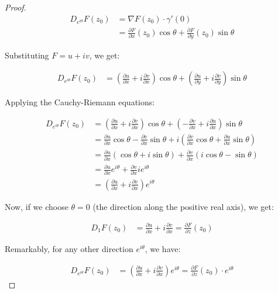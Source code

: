 \begin{proof}
\begin{align}
D_{e^{i\theta}}F(z_0) &= \nabla F(z_0) \cdot \gamma'(0) \\
&= \frac{\partial F}{\partial x}(z_0) \cos\theta + \frac{\partial F}{\partial y}(z_0) \sin\theta
\end{align}

Substituting $F = u + iv$, we get:

\begin{align}
D_{e^{i\theta}}F(z_0) &= \left(\frac{\partial u}{\partial x} + i\frac{\partial v}{\partial x}\right) \cos\theta + \left(\frac{\partial u}{\partial y} + i\frac{\partial v}{\partial y}\right) \sin\theta
\end{align}

Applying the Cauchy-Riemann equations:

\begin{align}
D_{e^{i\theta}}F(z_0) &= \left(\frac{\partial u}{\partial x} + i\frac{\partial v}{\partial x}\right) \cos\theta + \left(-\frac{\partial v}{\partial x} + i\frac{\partial u}{\partial x}\right) \sin\theta \\
&= \frac{\partial u}{\partial x}\cos\theta - \frac{\partial v}{\partial x}\sin\theta + i\left(\frac{\partial v}{\partial x}\cos\theta + \frac{\partial u}{\partial x}\sin\theta\right) \\
&= \frac{\partial u}{\partial x}(\cos\theta + i\sin\theta) + \frac{\partial v}{\partial x}(i\cos\theta - \sin\theta) \\
&= \frac{\partial u}{\partial x}e^{i\theta} + \frac{\partial v}{\partial x}ie^{i\theta} \\
&= \left(\frac{\partial u}{\partial x} + i\frac{\partial v}{\partial x}\right)e^{i\theta}
\end{align}

Now, if we choose $\theta = 0$ (the direction along the positive real axis), we get:

\begin{align}
D_{1}F(z_0) &= \frac{\partial u}{\partial x} + i\frac{\partial v}{\partial x} = \frac{\partial F}{\partial z}(z_0)
\end{align}

Remarkably, for any other direction $e^{i\theta}$, we have:

\begin{align}
D_{e^{i\theta}}F(z_0) &= \left(\frac{\partial u}{\partial x} + i\frac{\partial v}{\partial x}\right)e^{i\theta} = \frac{\partial F}{\partial z}(z_0) \cdot e^{i\theta}
\end{align}


\end{proof}
